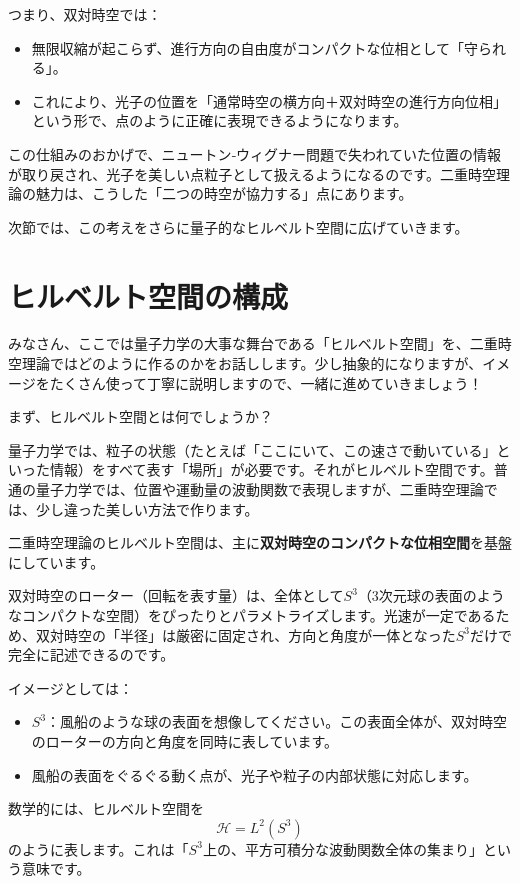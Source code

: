 \documentclass[dvipdfmx,12pt,a4paper]{article}
\begin{document}
つまり、双対時空では：
\begin{itemize}
  \item 無限収縮が起こらず、進行方向の自由度がコンパクトな位相として「守られる」。
  \item これにより、光子の位置を「通常時空の横方向＋双対時空の進行方向位相」という形で、点のように正確に表現できるようになります。
\end{itemize}

この仕組みのおかげで、ニュートン‐ウィグナー問題で失われていた位置の情報が取り戻され、光子を美しい点粒子として扱えるようになるのです。二重時空理論の魅力は、こうした「二つの時空が協力する」点にあります。

次節では、この考えをさらに量子的なヒルベルト空間に広げていきます。

\section{ヒルベルト空間の構成}

みなさん、ここでは量子力学の大事な舞台である「ヒルベルト空間」を、二重時空理論ではどのように作るのかをお話しします。少し抽象的になりますが、イメージをたくさん使って丁寧に説明しますので、一緒に進めていきましょう！

まず、ヒルベルト空間とは何でしょうか？

量子力学では、粒子の状態（たとえば「ここにいて、この速さで動いている」といった情報）をすべて表す「場所」が必要です。それがヒルベルト空間です。普通の量子力学では、位置や運動量の波動関数で表現しますが、二重時空理論では、少し違った美しい方法で作ります。

二重時空理論のヒルベルト空間は、主に\textbf{双対時空のコンパクトな位相空間}を基盤にしています。

双対時空のローター（回転を表す量）は、全体として$S^3$（3次元球の表面のようなコンパクトな空間）をぴったりとパラメトライズします。光速が一定であるため、双対時空の「半径」は厳密に固定され、方向と角度が一体となった$S^3$だけで完全に記述できるのです。

イメージとしては：
\begin{itemize}
  \item $S^3$：風船のような球の表面を想像してください。この表面全体が、双対時空のローターの方向と角度を同時に表しています。
  \item 風船の表面をぐるぐる動く点が、光子や粒子の内部状態に対応します。
\end{itemize}

数学的には、ヒルベルト空間を
\[
\mathcal{H} = L^2(S^3)
\]
のように表します。これは「$S^3$上の、平方可積分な波動関数全体の集まり」という意味です。
\end{document}

